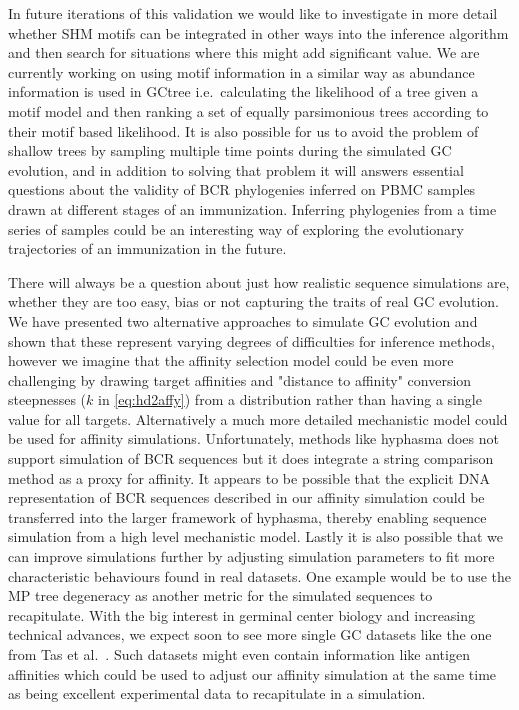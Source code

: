 In future iterations of this validation we would like to investigate in more detail whether SHM motifs can be integrated in other ways into the inference algorithm and then search for situations where this might add significant value.
We are currently working on using motif information in a similar way as abundance information is used in GCtree i.e.\ calculating the likelihood of a tree given a motif model and then ranking a set of equally parsimonious trees according to their motif based likelihood.
It is also possible for us to avoid the problem of shallow trees by sampling multiple time points during the simulated GC evolution, and in addition to solving that problem it will answers essential questions about the validity of BCR phylogenies inferred on PBMC samples drawn at different stages of an immunization.
Inferring phylogenies from a time series of samples could be an interesting way of exploring the evolutionary trajectories of an immunization in the future.

There will always be a question about just how realistic sequence simulations are, whether they are too easy, bias or not capturing the traits of real GC evolution.
We have presented two alternative approaches to simulate GC evolution and shown that these represent varying degrees of difficulties for inference methods, however we imagine that the affinity selection model could be even more challenging by drawing target affinities and "distance to affinity" conversion steepnesses ($k$ in \eqref{eq:hd2affy}) from a distribution rather than having a single value for all targets.
Alternatively a much more detailed mechanistic model could be used for affinity simulations.
Unfortunately, methods like hyphasma \cite{robert2017simulate} does not support simulation of BCR sequences but it does integrate a string comparison method as a proxy for affinity.
It appears to be possible that the explicit DNA representation of BCR sequences described in our affinity simulation could be transferred into the larger framework of hyphasma, thereby enabling sequence simulation from a high level mechanistic model.
Lastly it is also possible that we can improve simulations further by adjusting simulation parameters to fit more characteristic behaviours found in real datasets.
One example would be to use the MP tree degeneracy as another metric for the simulated sequences to recapitulate.
With the big interest in germinal center biology and increasing technical advances, we expect soon to see more single GC datasets like the one from Tas et al.\ \cite{tas2016visualizing}.
Such datasets might even contain information like antigen affinities which could be used to adjust our affinity simulation at the same time as being excellent experimental data to recapitulate in a simulation.


